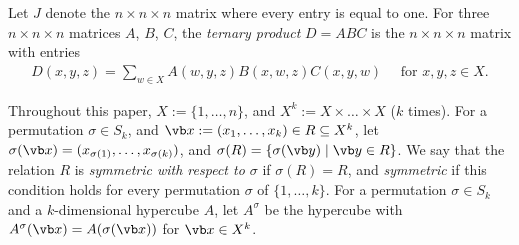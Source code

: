 \documentclass[11pt,oneside]{amsart}
\begin{document}
{Let $J$ denote  the  $n\times n\times n$ matrix where every entry is equal to one.
For three $n\times n\times n$ matrices $A$, $B$,  $C$, the \emph{ternary product}
$D=ABC$ is the $n\times n\times n$ matrix with entries
\begin{align} \label{ternaryprod}
D(x,y,z)=\sum_{w\in X}A(w,y,z)B(x,w,z)C(x,y,w)\quad \mbox{ for } x,y,z\in X.    
\end{align}

Throughout this paper, $X:=\{1,\dots,n\}$, and $X^k:=X\times \dots\times X$ ($k$ times). For a permutation $\sigma\in S_k$, and ${\vb x}:=(x_1,\dots,x_k)\in R\subseteq X^k$, let $\sigma(\vb x)=(x_{\sigma(1)},\dots,x_{\sigma(k)})$, and 
$\sigma(R)=\{\sigma(\vb y) \mid \vb y\in R\}$. We say that the relation $R$ is \emph{symmetric with respect to $\sigma$} if $\sigma(R)=R$, and  \emph{symmetric} if this condition holds for  every permutation $\sigma$ of $\{1,\dots,k\}$.  For a permutation $\sigma\in S_k$ and a $k$-dimensional hypercube $A$, let $A^ \sigma$ 
 be the hypercube with $A^ \sigma(\vb x)=A(\sigma(\vb x))$ for ${\vb x}\in X^k$.


}
\end{document}
